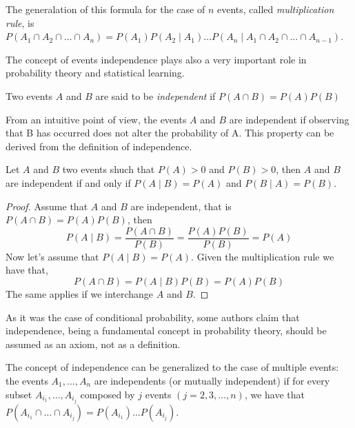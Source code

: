 The generalation of this formula for the case of $n$ events, called \emph{multiplication rule}, is $P \left( A_{1} \cap A_{2} \cap \ldots \cap A_{n} \right) = P \left( A_{1} \right) P \left( A_{2} \mid A_{1}\right) \ldots  P \left( A_{n} \mid A_{1}\cap A_{2} \cap \ldots \cap A_{n-1} \right)$.

The concept of events independence plays also a very important role in probability theory and statistical learning. 

\begin{definition}
Two events $A$ and $B$ are said to be \emph{independent} if $P \left( A \cap B \right) = P \left( A \right) P \left(B \right)$
\end{definition}

From an intuitive point of view, the events $A$ and $B$ are independent if observing that B has occurred does not alter the probability of A. This property can be derived from the definition of independence.

\begin{proposition}
Let $A$ and $B$ two events shuch that $P \left( A \right) > 0$ and $P \left( B \right)>0$, then $A$ and $B$ are independent if and only if $P \left( A \mid B\right) = P \left( A \right)$ and $P \left( B \mid  A \right) = P \left( B \right)$.
\end{proposition}
\begin{proof}
Assume that $A$ and $B$ are independent, that is $P \left( A \cap B \right) = P \left( A \right) P \left(B \right)$, then
\[
P \left( A \mid B \right) = \frac{P\left(A\cap B\right)}{P\left(B\right)} = \frac{P \left( A \right) P \left(B \right)}{P\left(B\right)} = P \left( A \right)
\]
Now let's assume that $P \left( A \mid B \right) = P \left( A \right)$. Given the multiplication rule we have that,
\[
P \left( A \cap B \right) =  P \left( A \mid B \right) P \left( B \right) = P \left( A \right) P \left( B \right)
\] 
The same applies if we interchange $A$ and $B$. 
\end{proof}

As it was the case of conditional probability, some authors claim that independence, being a fundamental concept in probability theory, should be assumed as an axiom, not as a definition.

The concept of independence can be generalized to the case of multiple events: the events $A_{1}, \ldots, A_{n}$ are independents (or mutually independent) if for every subset $A_{i_1}, \ldots, A_{i_j}$ composed by $j$ events $\left( j = 2, 3, \ldots, n \right)$, we have that $P \left( A_{i_1} \cap \ldots \cap A_{i_j} \right) = P \left( A_{i_1} \right) \ldots P \left( A_{i_j}\right)$.


